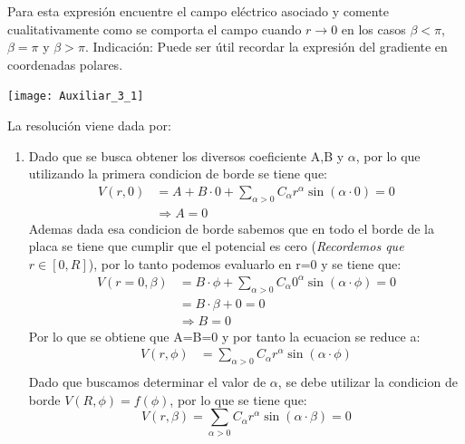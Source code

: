 \documentclass[
  11pt,
  letterpaper,
   addpoints,
   answers
  ]{exam}
\begin{document}
\begin{questions}
\begin{enumerate}
    Para esta expresión encuentre el campo eléctrico asociado y comente cualitativamente como se comporta el campo cuando \( r \rightarrow 0 \) en los casos \( \beta < \pi \), \( \beta = \pi \) y \( \beta > \pi \). Indicación: Puede ser útil recordar la expresión del gradiente en coordenadas polares. 
    \begin{center}
        \texttt{[image: Auxiliar\_3\_1]}
      \end{center}
    \end{enumerate}
    \begin{solution}
         La resolución viene dada por:
        \begin{enumerate}
            \item Dado que se busca obtener los diversos coeficiente A,B y $\alpha$, por lo que utilizando la primera condicion de borde se tiene que:
        \begin{align}
            V(r,0) &= A + B\cdot 0 + \sum_{\alpha > 0} C_{\alpha} r^{\alpha} \sin(\alpha \cdot 0) = 0 \\
                &\Rightarrow A = 0
        \end{align}
        Ademas dada esa condicion de borde sabemos que en todo el borde de la placa se tiene que cumplir que el potencial es cero (\textit{Recordemos que $r \in [0,R]$}), por lo tanto podemos evaluarlo en r=0 y se tiene que:
        \begin{align}
            V(r=0,\beta) &= B\cdot \phi + \sum_{\alpha > 0} C_{\alpha} 0^{\alpha} \sin(\alpha \cdot \phi) = 0 \\
                &= B\cdot \beta + 0 = 0\\
                &\Rightarrow B = 0
        \end{align}
        Por lo que se obtiene que A=B=0 y por tanto la ecuacion se reduce a:
        \begin{align}
            V(r,\phi) &= \sum_{\alpha > 0} C_{\alpha} r^{\alpha} \sin(\alpha \cdot \phi)\\
        \end{align}
        Dado que buscamos determinar el valor de $\alpha$, se debe utilizar la condicion de borde $V(R,\phi) = f(\phi)$, por lo que se tiene que:
        \begin{equation}
            V(r,\beta) = \sum_{\alpha > 0} C_{\alpha} r^{\alpha} \sin(\alpha \cdot \beta) = 0
        \end{equation}

\end{enumerate}
\end{solution}
\end{questions}
\end{document}
